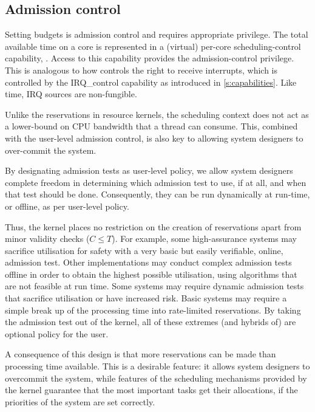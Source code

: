 \subsection{Admission control}
\label{sec:model-admission}

Setting budgets is admission control and requires appropriate
privilege. The total available time on a core is represented in a
(virtual) per-core scheduling-control capability, .
Access to this capability provides the admission-control
privilege. This is analogous to how \selfour controls the right
to receive interrupts, which is controlled by the IRQ\_control
capability as introduced in \cref{s:capabilities}. Like time, IRQ sources are non-fungible.

Unlike the reservations in resource kernels, the scheduling context does not 
act as a lower-bound on CPU bandwidth that a thread can consume. This, combined with the
user-level admission control, is also key to allowing system designers to over-commit the system. 

By designating admission tests as user-level policy, we allow system designers complete freedom
in determining which admission test to use, if at all, and when that test should be done.
Consequently, they can be run dynamically at run-time, or offline, as per user-level policy.

Thus, the kernel places no restriction on the creation of reservations apart from minor validity
checks (\ie $C \leq T$).
For example, some high-assurance systems may sacrifice utilisation for safety with a very basic but easily verifiable, online, admission test.
Other implementations may conduct complex admission tests offline in order to obtain the highest possible utilisation, using algorithms that are not feasible at run time.
Some systems may require dynamic admission tests that sacrifice utilisation or have increased risk.
Basic systems may require a simple break up of the processing time into rate-limited reservations.
By taking the admission test out of the kernel, all of these extremes (and hybrids of) are optional policy for the user.

A consequence of this design is that more reservations can be made than processing time available.
This is a desirable feature: it allows system designers to overcommit the system, while features of the scheduling mechanisms provided by the kernel guarantee that the most important tasks get their allocations, if the priorities of the system are set correctly.

